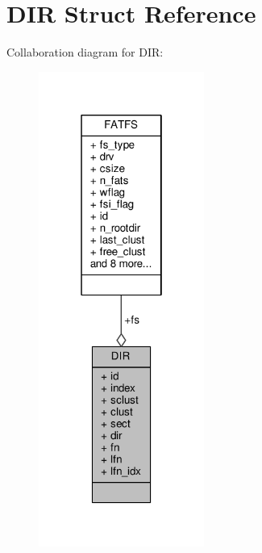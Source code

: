 \hypertarget{structDIR}{\section{D\+I\+R Struct Reference}
\label{structDIR}
}


Collaboration diagram for D\+I\+R\+:
\nopagebreak
\begin{figure}[H]
\begin{center}
\leavevmode
\includegraphics[width=154pt]{structDIR__coll__graph}
\end{center}
\end{figure}
